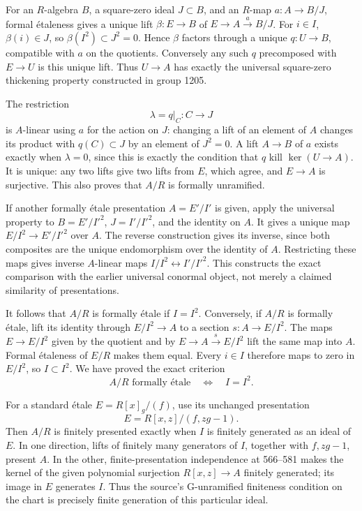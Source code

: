 For an \(R\)-algebra \(B\), a square-zero ideal \(J\subset B\), and an \(R\)-map \(a:A\to B/J\), formal étaleness gives a unique lift \(\beta:E\to B\) of \(E\to A\xrightarrow a B/J\). For \(i\in I\), \(\beta(i)\in J\), so \(\beta(I^2)\subset J^2=0\). Hence \(\beta\) factors through a unique \(q:U\to B\), compatible with \(a\) on the quotients. Conversely any such \(q\) precomposed with \(E\to U\) is this unique lift. Thus \(U\to A\) has exactly the universal square-zero thickening property constructed in group 1205.

The restriction \[
\lambda=q|_C:C\longrightarrow J
\] is \(A\)-linear using \(a\) for the action on \(J\): changing a lift of an element of \(A\) changes its product with \(q(C)\subset J\) by an element of \(J^2=0\). A lift \(A\to B\) of \(a\) exists exactly when \(\lambda=0\), since this is exactly the condition that \(q\) kill \(\ker(U\to A)\). It is unique: any two lifts give two lifts from \(E\), which agree, and \(E\to A\) is surjective. This also proves that \(A/R\) is formally unramified.

If another formally étale presentation \(A=E'/I'\) is given, apply the universal property to \(B=E'/I'^2\), \(J=I'/I'^2\), and the identity on \(A\). It gives a unique map \(E/I^2\to E'/I'^2\) over \(A\). The reverse construction gives its inverse, since both composites are the unique endomorphism over the identity of \(A\). Restricting these maps gives inverse \(A\)-linear maps \(I/I^2\leftrightarrow I'/I'^2\). This constructs the exact comparison with the earlier universal conormal object, not merely a claimed similarity of presentations.

It follows that \(A/R\) is formally étale if \(I=I^2\). Conversely, if \(A/R\) is formally étale, lift its identity through \(E/I^2\to A\) to a section \(s:A\to E/I^2\). The maps \(E\to E/I^2\) given by the quotient and by \(E\to A\xrightarrow s E/I^2\) lift the same map into \(A\). Formal étaleness of \(E/R\) makes them equal. Every \(i\in I\) therefore maps to zero in \(E/I^2\), so \(I\subset I^2\). We have proved the exact criterion \[
A/R\text{ formally étale}\quad\Longleftrightarrow\quad I=I^2.
\]

For a standard étale \(E=R[x]_g/(f)\), use its unchanged presentation \[
E=R[x,z]/(f,zg-1).
\] Then \(A/R\) is finitely presented exactly when \(I\) is finitely generated as an ideal of \(E\). In one direction, lifts of finitely many generators of \(I\), together with \(f,zg-1\), present \(A\). In the other, finite-presentation independence at 566--581 makes the kernel of the given polynomial surjection \(R[x,z]\to A\) finitely generated; its image in \(E\) generates \(I\). Thus the source's G-unramified finiteness condition on the chart is precisely finite generation of this particular ideal.

